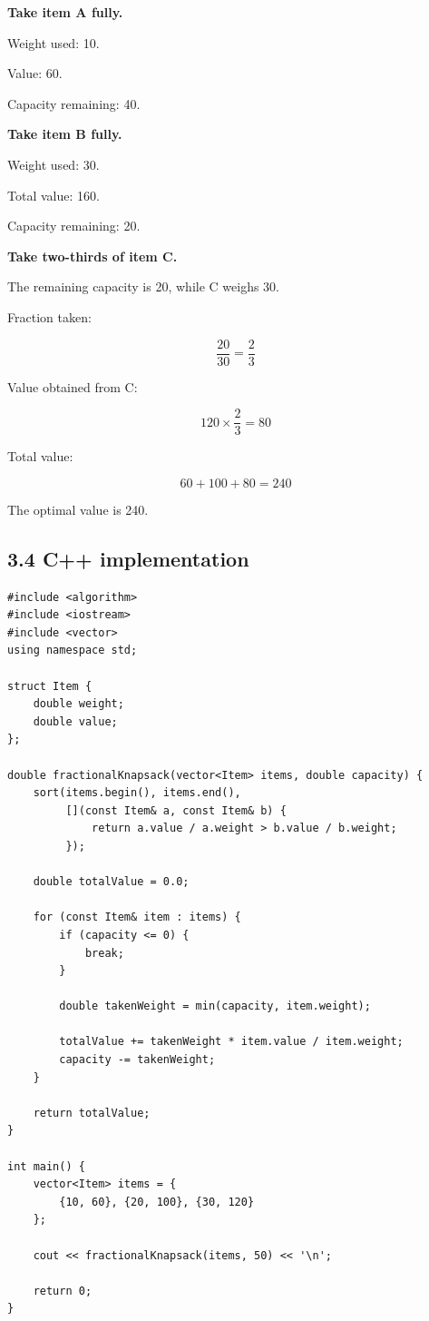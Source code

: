 \textbf{Take item A fully.}

Weight used: 10.

Value: 60.

Capacity remaining: 40.

\textbf{Take item B fully.}

Weight used: 30.

Total value: 160.

Capacity remaining: 20.

\textbf{Take two-thirds of item C.}

The remaining capacity is 20, while C weighs 30.

Fraction taken:


\[
\frac{20}{30}=\frac23
\]


Value obtained from C:


\[
120\times\frac23=80
\]


Total value:


\[
60+100+80=\boxed{240}
\]


The optimal value is 240.

\subsection{3.4 C++ implementation}

\begin{lstlisting}[style=cppstyle]
#include <algorithm>
#include <iostream>
#include <vector>
using namespace std;

struct Item {
    double weight;
    double value;
};

double fractionalKnapsack(vector<Item> items, double capacity) {
    sort(items.begin(), items.end(),
         [](const Item& a, const Item& b) {
             return a.value / a.weight > b.value / b.weight;
         });

    double totalValue = 0.0;

    for (const Item& item : items) {
        if (capacity <= 0) {
            break;
        }

        double takenWeight = min(capacity, item.weight);

        totalValue += takenWeight * item.value / item.weight;
        capacity -= takenWeight;
    }

    return totalValue;
}

int main() {
    vector<Item> items = {
        {10, 60}, {20, 100}, {30, 120}
    };

    cout << fractionalKnapsack(items, 50) << '\n';

    return 0;
}
\end{lstlisting}

